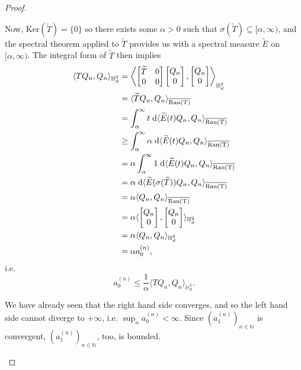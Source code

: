 \documentclass[11pt,reqno]{amsart}
\def\a{\alpha}
\def\s{\sigma}
\def\ker{\mathrm{Ker}}
\def\rmd{\mathrm{d}}
\def\NN{\mathbb{N}}
\def\HH{\mathbb{H}}
\theoremstyle{definition}
\numberwithin{equation}{section}
\renewcommand{\tilde}{\widetilde}
\begin{document}
\begin{proof}
\begin{enumerate}[align=left]
        Now,  \(\ker(\tilde{T}) = \{0\}\) so there exists some \(\a > 0\) such that \(\s(\tilde{T}) \subseteq [\a, \infty)\), and the spectral theorem applied to \(\tilde{T}\) provides us with a spectral measure \(\tilde{E}\) on \([\a,\infty)\). The integral form of \(\tilde{T}\) then implies
        \begin{align*}
            \langle TQ_n, Q_n \rangle_{\HH_d^2} & = \left\langle \begin{bmatrix}\tilde{T} & 0 \\ 0 & 0\end{bmatrix} \begin{bmatrix}Q_n \\ 0\end{bmatrix}, \begin{bmatrix}Q_n \\ 0\end{bmatrix} \right\rangle_{\HH_d^2} \\
            & = \langle \tilde{T}Q_n,Q_n \rangle_{\overline{\rm{Ran}(T)}} \\
            & = \int_\a^{\infty} t \; \rmd \langle \tilde{E}(t) Q_n, Q_n \rangle_{\overline{\rm{Ran}(T)}} \\
            & \geq \int_\a^\infty \a \; \rmd \langle \tilde{E}(t) Q_n, Q_n \rangle_{\overline{\rm{Ran}(T)}} \\
            & = \a \int_\a^\infty 1 \; \rmd \langle \tilde{E}(t) Q_n, Q_n \rangle_{\overline{\rm{Ran}(T)}} \\
            & = \a \; \rmd \langle \tilde{E}(\s(\tilde{T}))Q_n, Q_n \rangle_{\overline{\rm{Ran}(T)}} \\
            & = \a \langle Q_n, Q_n \rangle_{\overline{\rm{Ran}(T)}} \\
            & = \a \langle  \begin{bmatrix}Q_n \\ 0\end{bmatrix}, \begin{bmatrix}Q_n \\ 0\end{bmatrix} \rangle_{\HH_d^2} \\
            & = \a \langle Q_n, Q_n \rangle_{\HH_d^2} \\
            & = \a a_0^{(n)},
        \end{align*}
        i.e. 
        \[
            a_0^{(n)} \leq \frac{1}{\a} \langle TQ_n, Q_n \rangle_{\HH_d^2}.
        \]

        We have already seen that the right hand side converges, and so the left hand side cannot diverge to \(+\infty\), i.e. \(\sup_n a_0^{(n)} < \infty\). Since \((a_1^{(n)})_{n\in \NN}\) is convergent, \((a_1^{(n)})_{n\in \NN}\), too, is bounded. 


\end{enumerate}
\end{proof}
\end{document}
